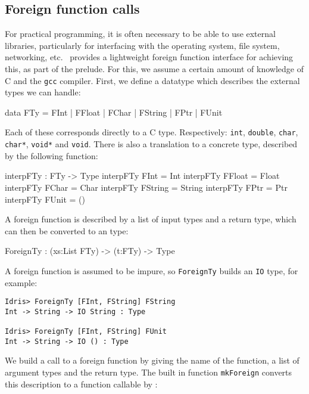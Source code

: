 \subsection{Foreign function calls}

For practical programming, it is often necessary to be able to use external libraries, particularly for interfacing with the operating system, file system, networking, etc.\
\Idris{} provides a lightweight foreign function interface for achieving this, as part of the prelude.
For this, we assume a certain amount of knowledge of C and the \texttt{gcc} compiler.
First, we define a datatype which describes the external types we can handle:

\begin{code}
data FTy = FInt | FFloat | FChar | FString | FPtr | FUnit
\end{code}

\noindent
Each of these corresponds directly to a C type.
Respectively: \texttt{int}, \texttt{double}, \texttt{char}, \texttt{char*}, \texttt{void*} and \texttt{void}.
There is also a translation to a concrete \Idris{} type, described by the following function:

\begin{code}
interpFTy : FTy -> Type
interpFTy FInt    = Int
interpFTy FFloat  = Float
interpFTy FChar   = Char
interpFTy FString = String
interpFTy FPtr    = Ptr
interpFTy FUnit   = ()
\end{code}

\noindent
A foreign function is described by a list of input types and a return type, which can then be converted to an \Idris{} type:

\begin{code}
ForeignTy : (xs:List FTy) -> (t:FTy) -> Type
\end{code}

\noindent
A foreign function is assumed to be impure, so \texttt{ForeignTy} builds an \texttt{IO} type, for example:

\begin{lstlisting}
Idris> ForeignTy [FInt, FString] FString
Int -> String -> IO String : Type

Idris> ForeignTy [FInt, FString] FUnit 
Int -> String -> IO () : Type
\end{lstlisting}

\noindent
We build a call to a foreign function by giving the name of the function, a list of argument types and the return type.
The built in function \texttt{mkForeign} converts this description to a function callable by \Idris{}:

